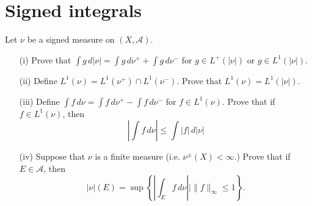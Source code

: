 \documentclass[lang=cn,11pt]{elegantbook}
\begin{document}
\section{Signed integrals}
  Let $\nu$ be a signed measure on $(X, \mathcal{A})$.
  \begin{itemize}
  \item[(i)]Prove that $\int g \, d |\nu|= \int g \, d \nu^+ + \int g \, d\nu^-$ for $g\in L^+(|\nu|)$ or $g\in L^1(|\nu|)$.
  \item[(ii)]Define $L^1(\nu)= L^1(\nu^+)\cap L^1(\nu^-)$. Prove that $L^1(\nu)=L^1(|\nu|)$. %
  \item[(iii)] Define $\int f \, d\nu  = \int f\, d\nu^+ - \int f \, d\nu^-$ for $f\in L^1(\nu)$. 
    Prove that if $f\in L^1(\nu)$, then 
    \begin{equation*}
      \left| \int f\, d\nu \right| \le \int |f| \, d |\nu|
    \end{equation*}
  \item[(iv)]Suppose that $\nu$ is a finite measure (i.e. $\nu^{\pm}(X)<\infty$.) Prove that if $E\in \mathcal{A}$, then 
    \[
      |\nu|(E)=\sup \left\{ \left| \int_E f \,d\nu \right|\mid  \|f\|_\infty \le 1 \right\}.
    \]
  \end{itemize}
\end{document}
